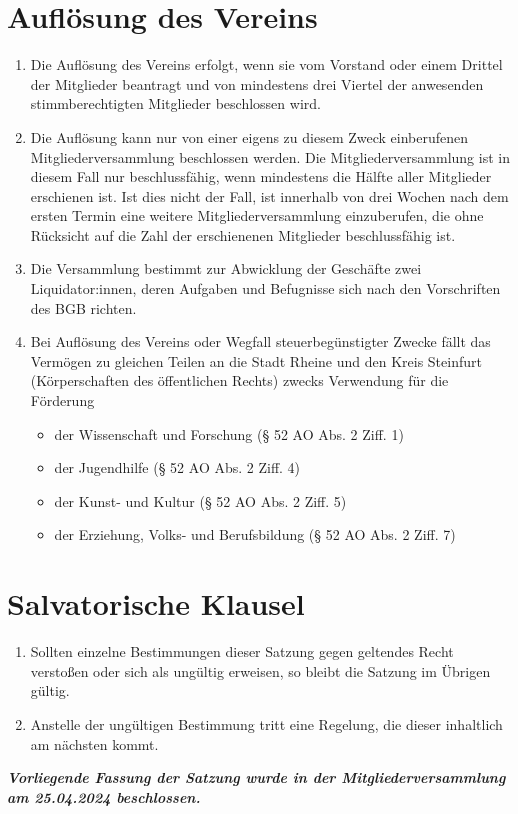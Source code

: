 \documentclass[12pt]{article}
\begin{document}
\section{Auflösung des Vereins}
\begin{enumerate}[label=(\arabic*)]
	\item  Die Auflösung des Vereins erfolgt, wenn sie vom Vorstand oder einem Drittel der Mitglieder
	      beantragt und von mindestens drei Viertel der anwesenden stimmberechtigten Mitglieder
	      beschlossen wird.
	\item  Die Auflösung kann nur von einer eigens zu diesem Zweck einberufenen Mitgliederversammlung
	      beschlossen werden. Die Mitgliederversammlung ist in diesem Fall nur beschlussfähig, wenn
	      mindestens die Hälfte aller Mitglieder erschienen ist. Ist dies nicht der Fall, ist innerhalb von drei
	      Wochen nach dem ersten Termin eine weitere Mitgliederversammlung einzuberufen, die ohne
	      Rücksicht auf die Zahl der erschienenen Mitglieder beschlussfähig ist.
	\item  Die Versammlung bestimmt zur Abwicklung der Geschäfte zwei Liquidator:innen, deren Aufgaben
	      und Befugnisse sich nach den Vorschriften des BGB richten.
	\item Bei Auflösung des Vereins oder Wegfall steuerbegünstigter Zwecke fällt das Vermögen zu
	      gleichen Teilen an die Stadt Rheine und den Kreis Steinfurt (Körperschaften des öffentlichen Rechts)
	      zwecks Verwendung für die Förderung
	      \begin{itemize}
		      \item der Wissenschaft und Forschung (§ 52 AO Abs. 2 Ziff. 1)
		      \item der Jugendhilfe (§ 52 AO Abs. 2 Ziff. 4)
		      \item der Kunst- und Kultur (§ 52 AO Abs. 2 Ziff. 5)
		      \item der Erziehung, Volks- und Berufsbildung (§ 52 AO Abs. 2 Ziff. 7)
	      \end{itemize}
\end{enumerate}

\section{Salvatorische Klausel}
\begin{enumerate}[label=(\arabic*)]
	\item Sollten einzelne Bestimmungen dieser Satzung gegen geltendes Recht verstoßen oder sich als
	      ungültig erweisen, so bleibt die Satzung im Übrigen gültig.
	\item Anstelle der ungültigen Bestimmung tritt eine Regelung, die dieser inhaltlich am nächsten kommt.
\end{enumerate}

\textbf{\textit{Vorliegende Fassung der Satzung wurde in der Mitgliederversammlung am 25.04.2024 beschlossen.}}
\end{document}
